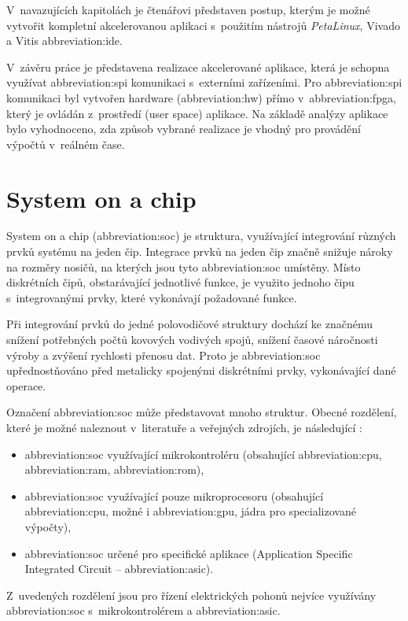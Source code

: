 \documentclass[a4paper, twoside, 11pt]{article}
\begin{document}
V~navazujících kapitolách je čtenářovi představen postup, kterým je možné vytvořit kompletní akcelerovanou aplikaci s~použitím nástrojů \textit{PetaLinux}, Vivado a Vitis \gls{abbreviation:ide}.\par
V~závěru práce je představena realizace akcelerované aplikace, která je schopna využívat \gls{abbreviation:spi} komunikaci s~externími zařízeními. Pro \gls{abbreviation:spi} komunikaci byl vytvořen hardware (\gls{abbreviation:hw}) přímo v~\gls{abbreviation:fpga}, který je ovládán z~prostředí (user space) aplikace. Na základě analýzy aplikace bylo vyhodnoceno, zda způsob vybrané realizace je vhodný pro provádění výpočtů v~reálném čase.

\flushbottom %
\newpage

\section{System on a chip}\label{sec:system-on-a-chip}
	System on a chip (\gls{abbreviation:soc}) je struktura, využívající integrování různých prvků systému na jeden čip. Integrace prvků na jeden čip značně snižuje nároky na rozměry nosičů, na kterých jsou tyto \gls{abbreviation:soc} umístěny. Místo diskrétních čipů, obstarávající jednotlivé funkce, je využito jednoho čipu s~integrovanými prvky, které vykonávají požadované funkce.\par
	Při integrování prvků do jedné polovodičové struktury dochází ke značnému snížení potřebných počtů kovových vodivých spojů, snížení časové náročnosti výroby a zvýšení rychlosti přenosu dat. Proto je \gls{abbreviation:soc} upřednostňováno před metalicky spojenými diskrétními prvky, vykonávající dané operace.\par
	Označení \gls{abbreviation:soc} může představovat mnoho struktur. Obecné rozdělení, které je možné naleznout v~literatuře a veřejných zdrojích, je následující \cite{tomshardware-system-on-chip}:
	\begin{itemize}
		\item \gls{abbreviation:soc} využívající mikrokontroléru (obsahující \gls{abbreviation:cpu}, \gls{abbreviation:ram}, \gls{abbreviation:rom}),
		\item \gls{abbreviation:soc} využívající pouze mikroprocesoru (obsahující \gls{abbreviation:cpu}, možné i \gls{abbreviation:gpu}, jádra pro specializované výpočty),
		\item \gls{abbreviation:soc} určené pro specifické aplikace (Application Specific Integrated Circuit – \gls{abbreviation:asic}).
	\end{itemize}\par
	Z~uvedených rozdělení jsou pro řízení elektrických pohonů nejvíce využívány \gls{abbreviation:soc} s~mikrokontrolérem a \gls{abbreviation:asic}.
\end{document}
